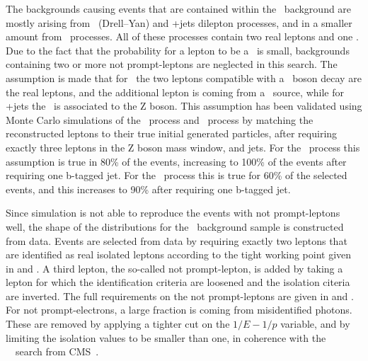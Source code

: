 The backgrounds causing events that are contained within the \NPL\ background  are mostly arising from \DY\ (Drell--Yan) and \ttbar+jets dilepton processes, and in a smaller amount from \WW\ processes. All of these processes contain two real leptons and one \NPL. Due to the fact that the probability for a lepton to be a \NPL\ is small, backgrounds containing two or more  not prompt-leptons are neglected in this search. The assumption is made that for \DY\ the two leptons compatible with a \PZ\ boson decay are the real leptons, and the additional lepton is coming from a \NPL\ source, while for \ttbar+jets the \NPL\ is associated to the Z boson. This assumption has been validated using Monte Carlo simulations of the \DY\ process and \ttbar\ process by matching the reconstructed leptons to their true initial generated particles, after requiring exactly three leptons in the Z boson mass window, and jets. For the \DY\ process this assumption is true in 80\% of the events, increasing to 100\% of the events after requiring one b-tagged jet. For the \ttbar\ process this is true for 60\% of the selected events, and this increases to 90\% after requiring one b-tagged jet.

Since simulation is not able to reproduce the events with not prompt-leptons well, the shape of the distributions for the \NPL\ background sample is constructed from data. Events are selected from data by requiring exactly  two leptons that are identified as real isolated leptons according to the tight working point given in  and . A third lepton, the so-called not prompt-lepton,  is added by taking a lepton for which the identification criteria are loosened and the isolation citeria are inverted. The full  requirements on the not prompt-leptons are given in  and . For not prompt-electrons, a large fraction is coming from misidentified photons. These are removed by applying a tighter cut on the $1/E-1/p$ variable, and by limiting the isolation values to be smaller than one, in coherence with the \SM\ \tZq\ search from CMS~\cite{CMS-PAS-TOP-16-020}. 

